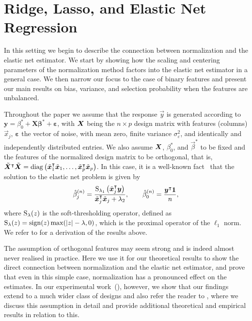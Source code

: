\section{Ridge, Lasso, and Elastic Net Regression}%
\label{sec:theory}

In this setting we begin to describe the connection between normalization and the elastic
net estimator. We start by showing how the scaling and centering parameters of the
normalization method factors into the elastic net estimator in a general case. We then
narrow our focus to the case of binary features and present our main results on bias,
variance, and selection probability when the features are unbalanced.

Throughout the paper we assume that the response \(\vec{y}\) is generated according to
\(\bm{y} = \beta_0^* + \bm{X\beta}^* + \bm{\varepsilon}\), with \(\bm X\) being the \(n
\times p\) design matrix with features (columns) \(\vec x_j\), \(\bm{\varepsilon}\) the
vector of noise, with mean zero, finite variance \(\sigma_\varepsilon^2\), and identically
and independently distributed entries. We also assume \(\bm{X}\), \(\beta_0^*\), and
\(\vec{\beta}^*\) to be fixed and the features of the normalized design matrix to be
orthogonal, that is, \(\tilde{\bm{X}}^\intercal \tilde{\bm{X}} =
\operatorname{diag}\left(\tilde{\bm{x}}_1^\intercal \tilde{\bm{x}}_1, \dots, \tilde{\bm{x}}_p^\intercal
\tilde{\bm{x}}_p\right)\). In this case, it is a well-known fact~\citep{tibshirani1996}
that the solution to the elastic net problem is given by
%
\begin{equation}
  \label{eq:orthogonal-solution-normalized}
  \hat{\beta}^{(n)}_j = \frac{\operatorname{S}_{\lambda_1}\left(\tilde{\bm{x}}_j^\intercal \bm{y}\right)}{\tilde{\bm{x}}_j^\intercal \tilde{\bm{x}}_j + \lambda_2},
  \qquad
  \hat{\beta}_0^{(n)} = \frac{\bm{y}^\intercal \bm{1}}{n},
\end{equation}
%
where \(\operatorname{S}_\lambda(z)\) is the soft-thresholding operator, defined as \(\operatorname{S}_\lambda(z) =
\operatorname{sign}(z) \max(|z| - \lambda, 0)\), which is the proximal operator of the \(\ell_1\) norm.
We refer to  for a derivation of the results above.

The assumption of orthogonal features may seem strong and is indeed almost never realised
in practice. Here we use it for our theoretical results to show the direct connection
between normalization and the elastic net estimator, and prove that even in this simple
case, normalization has a pronounced effect on the estimates. In our experimental
work~(), however, we show that our findings extend to a much wider
class of designs and also refer the reader to , where we
discuss this assumption in detail and provide additional theoretical and empirical results
in relation to this.

